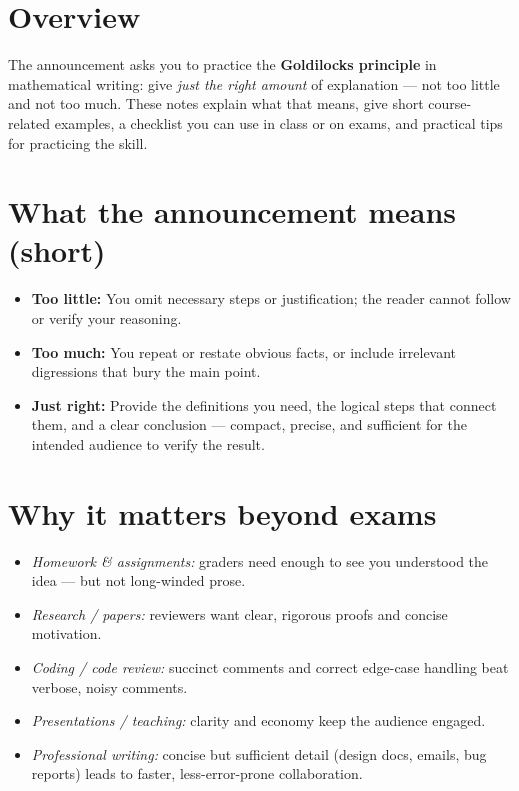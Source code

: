 \documentclass[10pt]{article}
\theoremstyle{definition}
\theoremstyle{plain}
\numberwithin{equation}{section}
\begin{document}
\section*{Overview}
The announcement asks you to practice the \textbf{Goldilocks principle} in mathematical writing: give \emph{just the right amount} of explanation — not too little and not too much. These notes explain what that means, give short course-related examples, a checklist you can use in class or on exams, and practical tips for practicing the skill.

\section{What the announcement means (short)}
\begin{itemize}
  \item \textbf{Too little:} You omit necessary steps or justification; the reader cannot follow or verify your reasoning.
  \item \textbf{Too much:} You repeat or restate obvious facts, or include irrelevant digressions that bury the main point.
  \item \textbf{Just right:} Provide the definitions you need, the logical steps that connect them, and a clear conclusion — compact, precise, and sufficient for the intended audience to verify the result.
\end{itemize}

\section{Why it matters beyond exams}
\begin{itemize}
  \item \emph{Homework \& assignments:} graders need enough to see you understood the idea — but not long-winded prose.
  \item \emph{Research / papers:} reviewers want clear, rigorous proofs and concise motivation.
  \item \emph{Coding / code review:} succinct comments and correct edge-case handling beat verbose, noisy comments.
  \item \emph{Presentations / teaching:} clarity and economy keep the audience engaged.
  \item \emph{Professional writing:} concise but sufficient detail (design docs, emails, bug reports) leads to faster, less-error-prone collaboration.
\end{itemize}
\end{document}
